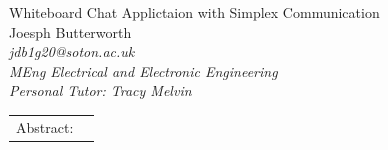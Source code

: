 \documentclass[10pt]{article}
\newcommand{\docTitle}{Whiteboard Chat Applictaion with Simplex Communication}
\newcommand{\docAuthor}{Joesph Butterworth}
\begin{document}

{
    \centering
    \fontsize{28pt}{29.4pt} \selectfont
    \docTitle\\
    \vspace{25pt}
    \fontsize{11pt}{11.55pt}\selectfont
    \docAuthor\\
    \fontsize{10pt}{10.5pt}\selectfont
    \textit{jdb1g20@soton.ac.uk} \\ %
    \textit{MEng Electrical and Electronic Engineering} \\ 
    \textit{Personal Tutor: Tracy Melvin} \\ %
}
\vspace{25pt}

{
\setlength{\tabcolsep}{0cm} %
\centering
\begin{tabular}{p{2cm}p{\textwidth-2cm}}
    Abstract: & 
    
\end{tabular}  
}
\vspace{25pt}
\end{document}

